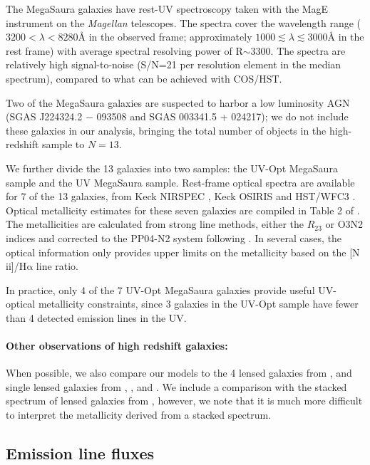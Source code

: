\documentclass[preprint2]{aastex62}
\newcommand{\nii}{[N\,{\sc ii}]\xspace}
\newcommand{\ha}{\ensuremath{\mathrm{H\alpha}}\xspace}
\newcommand{\ang}{\ensuremath{\mbox{\AA}}\xspace}
\newcommand{\mage}{{\sc Meg}a{\sc S}a{\sc ura}\xspace}
\begin{document}
The \mage galaxies have rest-UV spectroscopy taken with the MagE instrument on the \emph{Magellan} telescopes.
The spectra cover the wavelength range ($3200 < \lambda < 8280$\ang in the observed frame; approximately $1000 \lesssim \lambda \lesssim 3000$\ang in the rest frame) with average spectral resolving power of R$\sim3300$. The spectra are relatively high signal-to-noise (S/N=21 per resolution element in the median spectrum), compared to what can be achieved with COS/HST.

Two of the \mage galaxies are suspected to harbor a low luminosity AGN (SGAS J224324.2 − 093508 and SGAS 003341.5 + 024217); we do not include these galaxies in our analysis, bringing the total number of objects in the high-redshift sample to $N=13$.

We further divide the 13 galaxies into two samples: the UV-Opt \mage sample and the UV \mage sample. Rest-frame optical spectra are available for 7 of the 13 galaxies, from Keck NIRSPEC \citep{Rigby+2011}, Keck OSIRIS \citep{Wuyts+2014} and HST/WFC3 \citep{Whitaker+2014}. Optical metallicity estimates for these seven galaxies are compiled in Table 2 of \citet{Rigby+2018b}. The metallicities are calculated from strong line methods, either the $R_{23}$ or O3N2 indices \citep{Pettini+2004} and corrected to the PP04-N2 system following \citet{Kewley+2008}. In several cases, the optical information only provides upper limits on the metallicity based on the \nii/\ha line ratio.

In practice, only 4 of the 7 UV-Opt \mage galaxies provide useful UV-optical metallicity constraints, since 3 galaxies in the UV-Opt sample have fewer than 4 detected emission lines in the UV.

\paragraph{Other observations of high redshift galaxies:} When possible, we also compare our models to the 4 lensed galaxies from \citet{Stark+2014}, and single lensed galaxies from \citet{Erb+2010}, \citet{Christensen+2012}, and \citet{Berg+2018}. We include a comparison with the stacked spectrum of lensed galaxies from \citet{Steidel+2016}, however, we note that it is much more difficult to interpret the metallicity derived from a stacked spectrum.

\subsection{Emission line fluxes}
\end{document}

